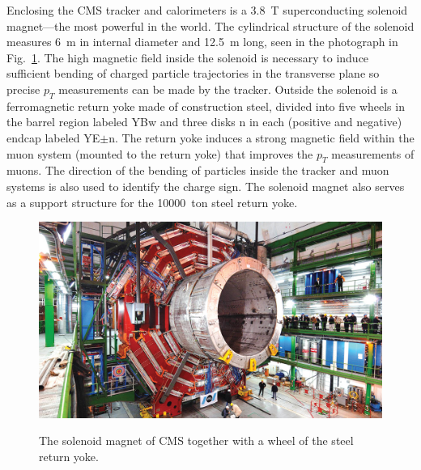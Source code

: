 

Enclosing the CMS tracker and calorimeters is a \SI{3.8}{T} superconducting solenoid magnet---the most powerful in the world. The cylindrical structure of the solenoid measures \SI{6}{m} in internal diameter and \SI{12.5}{m} long, seen in the photograph in Fig.~\ref{fig:Magnet}. The high magnetic field inside the solenoid is necessary to induce sufficient bending of charged particle trajectories in the transverse plane so precise $p_T$ measurements can be made by the tracker. Outside the solenoid is a ferromagnetic return yoke made of construction steel, divided into five wheels in the barrel region labeled YBw and three disks n in each (positive and negative) endcap labeled YE$\pm$n. The return yoke induces a strong magnetic field within the muon system (mounted to the return yoke) that improves the $p_T$ measurements of muons. The direction of the bending of particles inside the tracker and muon systems is also used to identify the charge sign. The solenoid magnet also serves as a support structure for the \SI{10000}{ton} steel return yoke.

\begin{figure}[H]
    \centering
    {\includegraphics[width=\textwidth]{Images/CMS/Magnet.jpg}}
    \caption{The solenoid magnet of CMS together with a wheel of the steel return yoke.}
    \label{fig:Magnet}
\end{figure}
